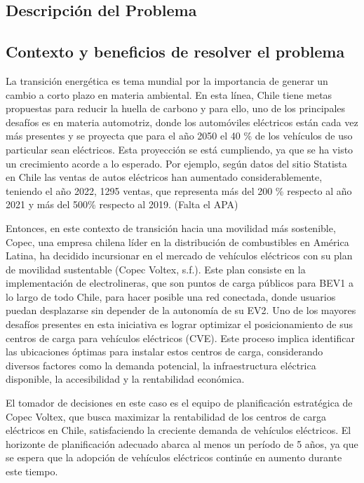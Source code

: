 \documentclass[letterpaper]{article}
\begin{document}
\newpage
\begin{flushleft}

	\section{Descripción del Problema}
	\subsection{Contexto y beneficios de resolver el problema}
	La transición energética es tema mundial por la importancia de generar un cambio a corto plazo en materia ambiental. En esta línea, Chile tiene metas propuestas para reducir la huella de carbono y para ello, uno de los principales desafíos es en materia automotriz, donde los automóviles eléctricos están cada vez más presentes y se proyecta que para el año 2050 el 40 \% de los vehículos de uso particular sean eléctricos.
	Esta proyección se está cumpliendo, ya que se ha visto un crecimiento acorde a lo esperado. Por ejemplo, según datos del sitio Statista en Chile las ventas de autos eléctricos han aumentado considerablemente, teniendo el año 2022, 1295 ventas, que representa más del 200 \% respecto al año 2021 y más del 500\% respecto al 2019. (Falta el APA)


	Entonces, en este contexto de transición hacia una movilidad más sostenible, Copec, una empresa chilena líder en la distribución de combustibles en América Latina, ha decidido incursionar en el mercado de vehículos eléctricos con su plan de movilidad sustentable (Copec Voltex, s.f.). Este plan consiste en la implementación de electrolineras, que son puntos de carga públicos para BEV1 a lo largo de todo Chile, para hacer posible una red conectada, donde usuarios puedan desplazarse sin depender de la autonomía de su EV2.
	Uno de los mayores desafíos presentes en esta iniciativa es lograr optimizar el posicionamiento de sus centros de carga para vehículos eléctricos (CVE). Este proceso implica identificar las ubicaciones óptimas para instalar estos centros de carga, considerando diversos factores como la demanda potencial, la infraestructura eléctrica disponible, la accesibilidad y la rentabilidad económica.

	El tomador de decisiones en este caso es el equipo de planificación estratégica de Copec Voltex, que busca maximizar la rentabilidad de los centros de carga eléctricos en Chile, satisfaciendo la creciente demanda de vehículos eléctricos. El horizonte de planificación adecuado abarca al menos un período de 5 años, ya que se espera que la adopción de vehículos eléctricos continúe en aumento durante este tiempo.


\end{flushleft}
\end{document}
